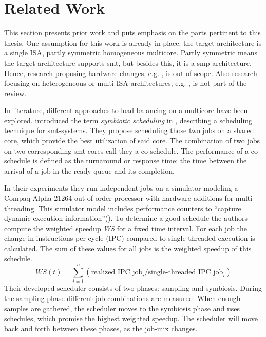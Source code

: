 \section{Related Work}
\label{state:related}

This section presents prior work and puts emphasis on the parts pertinent to
this thesis.
One assumption for this work is already in place:
the target architecture is a single ISA, partly symmetric homogeneous
multicore.
Partly symmetric means the target architecture supports \gls{smt},
but besides this, it is a \gls{smp} architecture.
Hence, research proposing hardware changes, e.g. \cite{cruz_dynamic_2014},
is out of scope.
Also research focusing on heterogeneous or multi-ISA architectures, e.g.
\cite{sarma_smartbalance_2015}, is not part of the review.



In literature, different approaches to load balancing on a multicore have been
explored.
\citeauthor{snavely_symbiotic_2000} introduced the term \emph{symbiotic
scheduling} in \cite{snavely_symbiotic_2000}, describing a scheduling technique
for \gls{smt}-systems.
They propose scheduling those two jobs on a shared core, which provide the best
utilization of said core.
The combination of two jobs on two corresponding \gls{smt}-cores call they a
co-schedule.
The performance of a co-schedule is defined as the turnaround or response time:
the time between the arrival of a job in the ready queue and its completion.

In their experiments they run independent jobs on a simulator modeling a Compaq
Alpha 21264 out-of-order processor with hardware additions for multi-threading.
This simulator model includes performance counters to ``capture dynamic execution
information''(\autocite[236]{snavely_symbiotic_2000}).
To determine a good schedule the authors compute the weighted speedup \textit{WS} for
a fixed time interval.
For each job the change in instructions per cycle (IPC) compared to
single-threaded execution is calculated.
The sum of these values for all jobs is the weighted speedup of this
schedule.
$$ WS(t) = \sum_{i=1}^n (\text{realized IPC job}_i / \text{single-threaded IPC
job}_i)$$
Their developed scheduler consists of two phases: sampling and symbiosis.
During the sampling phase different job combinations are measured.
When enough samples are gathered, the scheduler moves to the symbiosis phase
and uses schedules, which promise the highest weighted speedup.
The scheduler will move back and forth between these phases, as the job-mix
changes.

